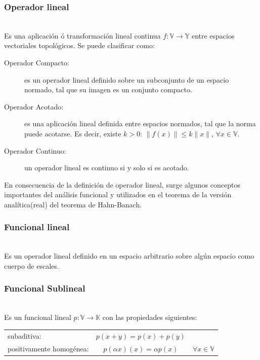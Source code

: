 \documentclass[10pt]{amsart}
\theoremstyle{remark}
\numberwithin{equation}{section}
\begin{document}
\subsubsection{Operador lineal} \cite{Cur05} \\
Es una aplicación ó transformación lineal continua $f:\mathbb{V} \longrightarrow \mathbb{Y}$ entre espacios vectoriales topológicos. Se puede clasificar como:\\
\renewcommand{\descriptionlabel}[1] %
{\hspace*{0.5cm}\textit{#1}}
\begin{description}
\item[Operador Compacto: ] es un operador lineal definido sobre un subconjunto de un espacio normado, tal que su imagen es un conjunto compacto.\\

\item[Operador Acotado: ] es una aplicación lineal definida entre espacios normados, tal que la norma puede acotarse. Es decir, existe $k>0$: $\parallel f(x) \parallel \leq k \parallel x \parallel$, $ \forall x \in \mathbb{V}$.\\ \item[Operador Continuo: ] un operador lineal es continuo si y solo si es acotado.\\
\end{description} En consecuencia de la definición de operador lineal, surge algunos conceptos importantes del análisis funcional y utilizados en el teorema de la versión analítica(real) del teorema de Hahn-Banach.\\ 
\subsubsection{Funcional lineal} \ \\
Es un operador lineal definido en un espacio arbitrario sobre algún espacio como cuerpo de escales.\\

\subsubsection{Funcional Sublineal} \ \\ Es un funcional lineal $p:\mathbb{V} \longrightarrow \mathbb{K} $ con las propiedades siguientes:\\

\begin{tabular}{l  c r}
subaditiva: & \hspace*{1cm} $ p(x + y) = p(x)+ p(y)$ & \\
positivamente homogénea: & $p(\alpha x)(x)= \alpha p(x) $ & $ \forall x \in \mathbb{V}$\\[0.8cm]
\end{tabular} 
\end{document}
